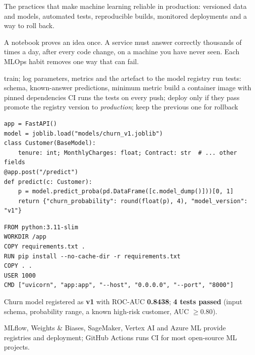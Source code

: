 \documentclass[11pt,a4paper]{article}
\begin{document}
\begin{bdef}[MLOps]
The practices that make machine learning reliable in production: versioned data and models, automated tests, reproducible builds, monitored deployments and a way to roll back.
\end{bdef}
A notebook proves an idea once. A service must answer correctly thousands of times a day, after every code change, on a machine you have never seen. Each MLOps habit removes one way that can fail.
\begin{balgo}
\begin{algorithmic}[1]
\State train; log parameters, metrics and the artefact to the model registry
\State run tests: schema, known-answer predictions, minimum metric
\State build a container image with pinned dependencies
\State CI runs the tests on every push; deploy only if they pass
\State promote the registry version to \emph{production}; keep the previous one for rollback
\end{algorithmic}
\end{balgo}
\begin{bcode}
\begin{lstlisting}
app = FastAPI()
model = joblib.load("models/churn_v1.joblib")
class Customer(BaseModel):
    tenure: int; MonthlyCharges: float; Contract: str  # ... other fields
@app.post("/predict")
def predict(c: Customer):
    p = model.predict_proba(pd.DataFrame([c.model_dump()]))[0, 1]
    return {"churn_probability": round(float(p), 4), "model_version": "v1"}
\end{lstlisting}
\end{bcode}
\begin{bcode}[Dockerfile]
\begin{lstlisting}
FROM python:3.11-slim
WORKDIR /app
COPY requirements.txt .
RUN pip install --no-cache-dir -r requirements.txt
COPY . .
USER 1000
CMD ["uvicorn", "app:app", "--host", "0.0.0.0", "--port", "8000"]
\end{lstlisting}
\end{bcode}
\begin{bres}
Churn model registered as \textbf{v1} with ROC-AUC \textbf{0.8438}; \textbf{4 tests passed} (input schema, probability range, a known high-risk customer, AUC $\ge0.80$).
\end{bres}
\begin{bapp}
MLflow, Weights \& Biases, SageMaker, Vertex AI and Azure ML provide registries and deployment; GitHub Actions runs CI for most open-source ML projects.
\end{bapp}
\end{document}
